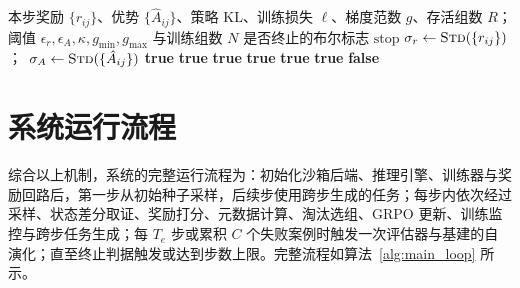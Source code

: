 \begin{algorithm}[htbp]
\caption{自进化稳定性监控与自动终止}
\label{alg:stability}
\begin{algorithmic}[1]
\Require 本步奖励 $\{r_{ij}\}$、优势 $\{\hat{A}_{ij}\}$、策略 KL、训练损失 $\ell$、梯度范数 $g$、存活组数 $R$；阈值 $\epsilon_r,\epsilon_A,\kappa,g_{\min},g_{\max}$ 与训练组数 $N$
\Ensure 是否终止的布尔标志 $\text{stop}$
\State $\sigma_r \gets \textproc{Std}(\{r_{ij}\})$；\ $\sigma_A \gets \textproc{Std}(\{\hat{A}_{ij}\})$ 
 \Return \textbf{true} 
 \Return \textbf{true} 
 \Return \textbf{true} 
 \Return \textbf{true} 
 \Return \textbf{true} 
 \Return \textbf{true} 
\EndIf
\State \Return \textbf{false} 
\end{algorithmic}
\end{algorithm}

\section{系统运行流程}

综合以上机制，系统的完整运行流程为：初始化沙箱后端、推理引擎、训练器与奖励回路后，第一步从初始种子采样，后续步使用跨步生成的任务；每步内依次经过采样、状态差分取证、奖励打分、元数据计算、淘汰选组、GRPO 更新、训练监控与跨步任务生成；每 $T_e$ 步或累积 $C$ 个失败案例时触发一次评估器与基建的自演化；直至终止判据触发或达到步数上限。完整流程如算法~\ref{alg:main_loop} 所示。

